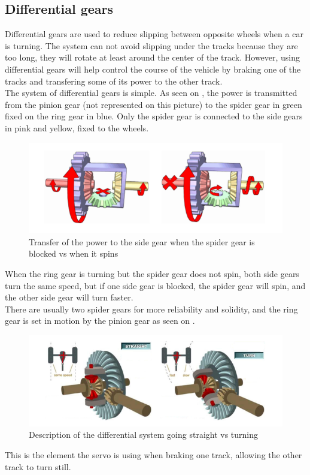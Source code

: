 \subsection{Differential gears}

Differential gears are used to reduce slipping between opposite wheels when a car is turning. The system can not avoid slipping under the tracks because they are too long, they will rotate at least around the center of the track. However, using differential gears will help control the course of the vehicle by braking one of the tracks and transfering some of its power to the other track.\\

The system of differential gears is simple. As seen on , the power is transmitted from the pinion gear (not represented on this picture) to the spider gear in green fixed on the ring gear in blue. Only the spider gear is connected to the side gears in pink and yellow, fixed to the wheels.\\

\begin{figure}[H]
	\centering
	\includegraphics[scale=0.7]{figures/diffGearLight}
	\caption{Transfer of the power to the side gear when the spider gear is blocked vs when it spins \cite{MechanicalEngineering}}
	\label{diffGearLight}
\end{figure}

When the ring gear is turning but the spider gear does not spin, both side gears turn the same speed, but if one side gear is blocked, the spider gear will spin,  and the other side gear will turn faster.\\

There are usually two spider gears for more reliability and solidity, and the ring gear is set in motion by the pinion gear as seen on .\\

\begin{figure}[H]
	\centering
	\includegraphics[scale=0.7]{figures/diffGearFull}
	\caption{Description of the differential system going straight vs turning \cite{MechanicalEngineering}}
	\label{diffGearFull}
\end{figure}

This is the element the servo is using when braking one track, allowing the other track to turn still.\\